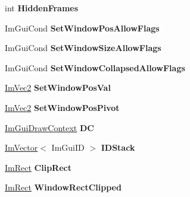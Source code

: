 \begin{DoxyCompactItemize}
\mbox{\label{struct_im_gui_window_a91f60ca5e2e9ff4c34957e7cc239193e}} 
int {\bfseries Hidden\+Frames}
\item 
\mbox{\label{struct_im_gui_window_a8ff69a8bdc9221c9cc7d8ba656013d84}} 
Im\+Gui\+Cond {\bfseries Set\+Window\+Pos\+Allow\+Flags}
\item 
\mbox{\label{struct_im_gui_window_a0c9419d95253214cb2a71d6ead1e03d6}} 
Im\+Gui\+Cond {\bfseries Set\+Window\+Size\+Allow\+Flags}
\item 
\mbox{\label{struct_im_gui_window_a48384a3767252325e5c71b534adc58a9}} 
Im\+Gui\+Cond {\bfseries Set\+Window\+Collapsed\+Allow\+Flags}
\item 
\mbox{\label{struct_im_gui_window_a6caed47ef8e25a2e7a68a6be72c5716a}} 
\hyperlink{struct_im_vec2}{Im\+Vec2} {\bfseries Set\+Window\+Pos\+Val}
\item 
\mbox{\label{struct_im_gui_window_a4de5608bf44728447327d832fa84f0c9}} 
\hyperlink{struct_im_vec2}{Im\+Vec2} {\bfseries Set\+Window\+Pos\+Pivot}
\item 
\mbox{\label{struct_im_gui_window_a3a20c68996093058481ae8e174258a04}} 
\hyperlink{struct_im_gui_draw_context}{Im\+Gui\+Draw\+Context} {\bfseries DC}
\item 
\mbox{\label{struct_im_gui_window_a1a71724c43e37830ed9b38bd34f26917}} 
\hyperlink{class_im_vector}{Im\+Vector}$<$ Im\+Gui\+ID $>$ {\bfseries I\+D\+Stack}
\item 
\mbox{\label{struct_im_gui_window_a9950a40b18de2579c4d3deb0ab33f455}} 
\hyperlink{struct_im_rect}{Im\+Rect} {\bfseries Clip\+Rect}
\item 
\mbox{\label{struct_im_gui_window_ae0af9ff6c93baad6848143dd9d742ddd}} 
\hyperlink{struct_im_rect}{Im\+Rect} {\bfseries Window\+Rect\+Clipped}
\item 
\mbox{\label{struct_im_gui_window_a6f3c194efabb4fd0a99be45fa5fe26f1}} 

\end{DoxyCompactItemize}
